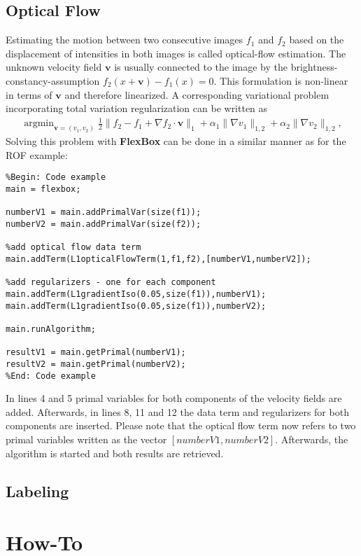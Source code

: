 \documentclass[final,leqno,onefignum,onetabnum]{article}
\newcommand{\1}[1]{\mathds{1}_{#1}}
\DeclareMathOperator*{\argmin}{\arg \min}%
\begin{document}
\subsection{Optical Flow}
Estimating the motion between two consecutive images $f_1$ and $f_2$ based on the displacement of intensities in both images is called optical-flow estimation. The unknown velocity field $\boldsymbol{v}$ is usually connected to the image by the brightness-constancy-assumption $f_2(x+\boldsymbol{v})-f_1(x)=0$. This formulation is non-linear in terms of $\boldsymbol{v}$ and therefore linearized. A corresponding variational problem incorporating total variation regularization can be written as
\begin{align}
	\argmin_{\boldsymbol{v}=(v_1,v_2)} \frac{1}{2}\|f_2-f_1 + \nabla f_2\cdot\boldsymbol{v}\|_1 + \alpha_1 \|\nabla v_1\|_{1,2} + \alpha_2\|\nabla v_2\|_{1,2},
\end{align}
Solving this problem with \textbf{FlexBox} can be done in a similar manner as for the ROF example:
\begin{lstlisting} 
%Begin: Code example
main = flexbox;

numberV1 = main.addPrimalVar(size(f1));
numberV2 = main.addPrimalVar(size(f2));

%add optical flow data term
main.addTerm(L1opticalFlowTerm(1,f1,f2),[numberV1,numberV2]);

%add regularizers - one for each component
main.addTerm(L1gradientIso(0.05,size(f1)),numberV1);
main.addTerm(L1gradientIso(0.05,size(f1)),numberV2);

main.runAlgorithm;

resultV1 = main.getPrimal(numberV1);
resultV2 = main.getPrimal(numberV2);
%End: Code example
\end{lstlisting}
In lines 4 and 5 primal variables for both components of the velocity fields are added. Afterwards, in lines 8, 11 and 12 the data term and regularizers for both components are inserted. Please note that the optical flow term now refers to two primal variables written as the vector $[numberV1,numberV2]$. Afterwards, the algorithm is started and both results are retrieved.







\subsection{Labeling}

\section{How-To}
\end{document}
